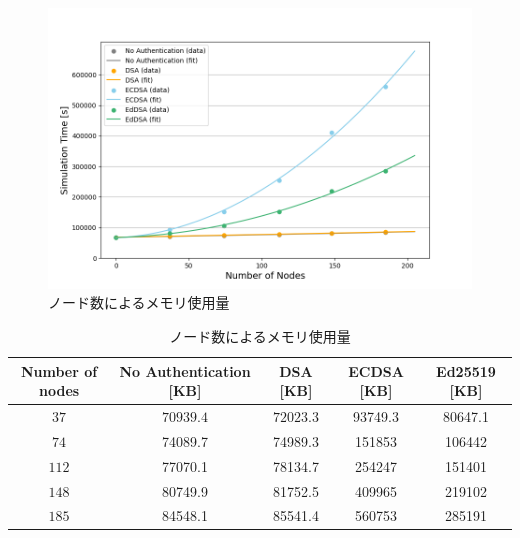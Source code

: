 \begin{figure}
  \centering
  \includegraphics[width=1\textwidth]{figures/exp3_memory.png}
  \caption{ノード数によるメモリ使用量}
  \label{fig:memory_usages}
\end{figure}

\clearpage
\setlength{\tabcolsep}{4pt}
\begin{longtable}{c|cccc}
  \caption{ノード数によるメモリ使用量}
  \label{tab:exp3_memory} \\
  \endfirsthead
  \hline
  Number of nodes & No Authentication [KB] & DSA [KB] & ECDSA [KB] & Ed25519 [KB] \\ \hline \hline
  $37$ & $70939.4$ & $72023.3$ & 93749.3 & 80647.1 \\
  $74$ & 74089.7 & 74989.3 & 151853 & 106442 \\
  $112$ & 77070.1 & 78134.7 & 254247 & 151401 \\
  $148$ & 80749.9 & 81752.5 & 409965 & 219102 \\
  $185$ & 84548.1 & 85541.4 & 560753 & 285191 \\ \hline
\end{longtable}



